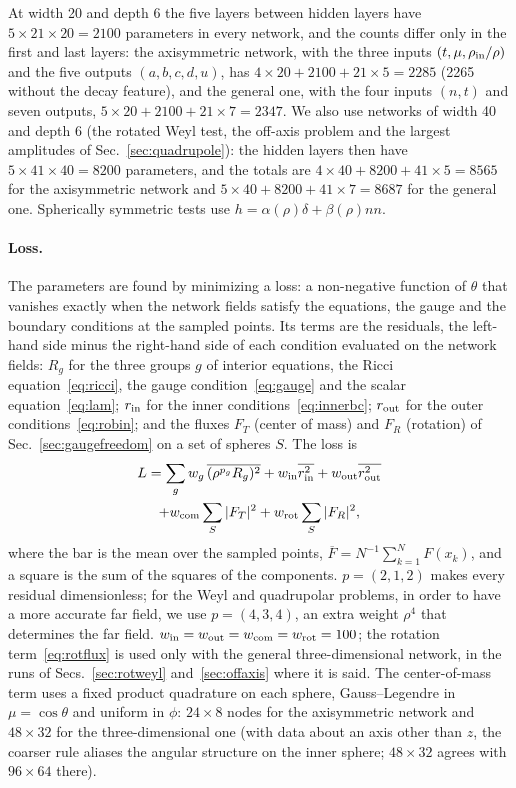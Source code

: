 \documentclass[aps,prd,twocolumn,superscriptaddress, nofootinbib,floatfix]{revtex4-2}
\begin{document}
At width 20 and depth 6 the five layers between hidden layers have $5\times21\times20 = 2100$ parameters in every network, and the counts differ only in the first and last layers: the axisymmetric network, with the three inputs $(t,\mu,\rho_{\rm in}/\rho)$ and the five outputs $(a,b,c,d,u)$, has $4\times20+2100+21\times5 = 2285$ (2265 without the decay feature), and the general one, with the four inputs $(n,t)$ and seven outputs, $5\times20+2100+21\times7 = 2347$.
We also use networks of width 40 and depth 6 (the rotated Weyl test, the off-axis problem and the largest amplitudes of Sec.~\ref{sec:quadrupole}): the hidden layers then have $5\times41\times40 = 8200$ parameters, and the totals are $4\times40+8200+41\times5 = 8565$ for the axisymmetric network and $5\times40+8200+41\times7 = 8687$ for the general one.
Spherically symmetric tests use $h = \alpha(\rho)\delta+\beta(\rho)nn$.

\paragraph{Loss.} The parameters are found by minimizing a loss: a non-negative function of $\theta$ that vanishes exactly when the network fields satisfy the equations, the gauge and the boundary conditions at the sampled points.
Its terms are the residuals, the left-hand side minus the right-hand side of each condition evaluated on the network fields: $R_g$ for the three groups $g$ of interior equations, the Ricci equation~\eqref{eq:ricci}, the gauge condition~\eqref{eq:gauge} and the scalar equation~\eqref{eq:lam}; $r_{\rm in}$ for the inner conditions~\eqref{eq:innerbc}; $r_{\rm out}$ for the outer conditions~\eqref{eq:robin}; and the fluxes $F_T$ (center of mass) and $F_R$ (rotation) of Sec.~\ref{sec:gaugefreedom} on a set of spheres $S$.
The loss is
\begin{multline}
  L = \sum_g w_g\,\overline{(\rho^{p_g}R_g)^2}
     + w_{\rm in}\overline{r_{\rm in}^2} + w_{\rm out}\overline{r_{\rm out}^2} \\
     + w_{\rm com}\sum_S|F_T|^2 + w_{\rm rot}\sum_S|F_R|^2 ,
  \label{eq:loss}
\end{multline}
where the bar is the mean over the sampled points, $\overline{F} = N^{-1}\sum_{k=1}^{N}F(x_k)$, and a square is the sum of the squares of the components.
$p=(2,1,2)$ makes every residual dimensionless; for the Weyl and quadrupolar problems, in order to have a more accurate far field, we use $p=(4,3,4)$, an extra weight $\rho^4$ that determines the far field.
$w_{\rm in}=w_{\rm out}=w_{\rm com}=w_{\rm rot}=100$; the rotation term~\eqref{eq:rotflux} is used only with the general three-dimensional network, in the runs of Secs.~\ref{sec:rotweyl} and~\ref{sec:offaxis} where it is said.
The center-of-mass term uses a fixed product quadrature on each sphere, Gauss--Legendre in $\mu=\cos\theta$ and uniform in $\phi$: $24\times8$ nodes for the axisymmetric network and $48\times32$ for the three-dimensional one (with data about an axis other than $z$, the coarser rule aliases the angular structure on the inner sphere; $48\times32$ agrees with $96\times64$ there).
\end{document}
